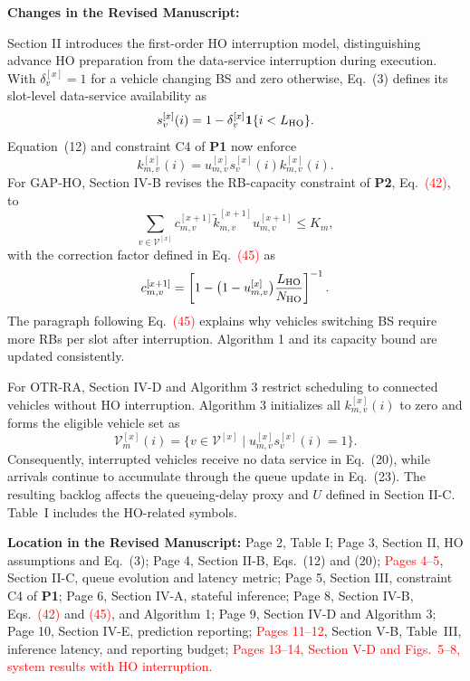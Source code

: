 \documentclass[11pt]{article}
\newenvironment{reviewedit}[1]
{\colorlet{responseblue}{#1}\colorlet{changeblue}{#1}\color{#1}}
{}
\newenvironment{manuscriptchanges}
{\par\noindent\textcolor{changeblue}{\textbf{Changes in the Revised Manuscript:}}\par\color{changeblue}}
{\par}
\newcommand{\revisionlocation}[1]{%
  \par\noindent\textbf{Location in the Revised Manuscript:} #1\par
}
\begin{document}
\begin{reviewedit}{blue}
\begin{manuscriptchanges}
Section II introduces the first-order HO interruption model, distinguishing
advance HO preparation from the data-service interruption during execution.
With $\delta_v^{[x]}=1$ for a vehicle changing BS and zero otherwise,
Eq.~(3) defines its slot-level data-service availability as
\[
s_v^{[x]}(i)=1-\delta_v^{[x]}\mathbf{1}\{i<L_{\rm HO}\}.
\]
Equation~(12) and constraint C4 of \textbf{P1} now enforce
\[
k_{m,v}^{[x]}(i)=u_{m,v}^{[x]}s_v^{[x]}(i)k_{m,v}^{[x]}(i).
\]
For GAP-HO, Section IV-B revises the RB-capacity constraint of \textbf{P2},
Eq.~\textcolor{red}{(42)}, to
\[
\sum_{v\in\mathcal{V}^{[x]}}
c_{m,v}^{[x+1]}\tilde{k}_{m,v}^{[x+1]}u_{m,v}^{[x+1]}\leq K_m,
\]
with the correction factor defined in Eq.~\textcolor{red}{(45)} as
\[
c_{m,v}^{[x+1]}=
\left[1-\bigl(1-u_{m,v}^{[x]}\bigr)
\frac{L_{\rm HO}}{N_{\rm HO}}\right]^{-1}.
\]
The paragraph following Eq.~\textcolor{red}{(45)} explains why vehicles switching BS require
more RBs per slot after interruption. Algorithm 1 and its capacity bound
are updated consistently.

For OTR-RA, Section IV-D and Algorithm 3 restrict scheduling to connected
vehicles without HO interruption. Algorithm 3 initializes all
$k_{m,v}^{[x]}(i)$ to zero and forms the eligible vehicle set as
\[
\mathcal{V}_m^{[x]}(i)=
\{v\in\mathcal{V}^{[x]}\mid u_{m,v}^{[x]}s_v^{[x]}(i)=1\}.
\]
Consequently, interrupted vehicles receive no data service in Eq.~(20),
while arrivals continue to accumulate through the queue update in Eq.~(23).
The resulting backlog affects the queueing-delay proxy and $U$ defined in
Section II-C. Table~I includes the HO-related symbols.
\end{manuscriptchanges}
\revisionlocation{Page 2, Table I;
Page 3, Section II, HO assumptions and Eq.~(3);
Page 4, Section II-B, Eqs.~(12) and (20);
\textcolor{red}{Pages 4--5}, Section II-C, queue evolution and latency metric;
Page 5, Section III, constraint C4 of \textbf{P1};
Page 6, Section IV-A, stateful inference;
Page 8, Section IV-B, Eqs.~\textcolor{red}{(42)} and \textcolor{red}{(45)}, and Algorithm 1;
Page 9, Section IV-D and Algorithm 3;
Page 10, Section IV-E, prediction reporting;
\textcolor{red}{Pages 11--12}, Section V-B, Table~III, inference latency, and reporting budget;
\textcolor{red}{Pages 13--14, Section V-D and Figs.~5--8, system results with HO interruption.}}

\end{reviewedit}
\end{document}
